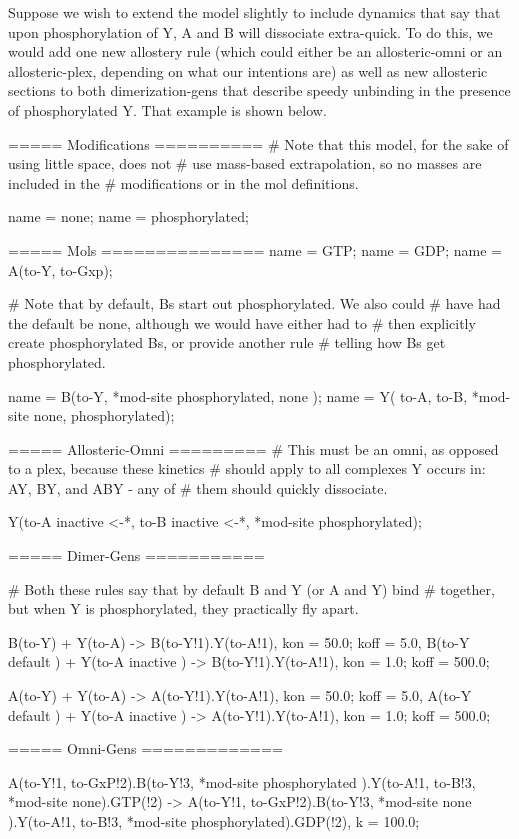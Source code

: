 Suppose we wish to extend the model slightly to include dynamics that
say that upon phosphorylation of Y, A and B will dissociate
extra-quick.  To do this, we would add one new allostery rule (which
could either be an allosteric-omni or an allosteric-plex, depending on
what our intentions are) as well as new allosteric sections to both
dimerization-gens that describe speedy unbinding in the presence of
phosphorylated Y.  That example is shown below.  



\begin{ExampleMZR}
===== Modifications ==========
# Note that this model, for the sake of using little space, does not
# use mass-based extrapolation, so no masses are included in the
# modifications or in the mol definitions.

name = none;
name = phosphorylated;


===== Mols ===============
name = GTP;
name = GDP;
name = A(to-Y, to-Gxp);

# Note that by default, Bs start out phosphorylated.  We also could
# have had the default be none, although we would have either had to
# then explicitly create phosphorylated Bs, or provide another rule
# telling how Bs get phosphorylated.

name = B(to-Y, *mod-site {phosphorylated, none} );
name = Y( to-A, to-B, *mod-site {none, phosphorylated});

===== Allosteric-Omni =========
# This must be an omni, as opposed to a plex, because these kinetics
# should apply to all complexes Y occurs in: AY, BY, and ABY - any of
# them should quickly dissociate.

Y(to-A {inactive <-*}, to-B {inactive <-*}, *mod-site {phosphorylated});


===== Dimer-Gens ===========

# Both these rules say that by default B and Y (or A and Y) bind
# together, but when Y is phosphorylated, they practically fly apart. 

B(to-Y) + Y(to-A) -> B(to-Y!1).Y(to-A!1),
   kon = 50.0;
   koff = 5.0,
  B(to-Y {default} ) + Y(to-A {inactive} ) -> B(to-Y!1).Y(to-A!1),
     kon = 1.0;
     koff = 500.0;

A(to-Y) + Y(to-A) -> A(to-Y!1).Y(to-A!1),
   kon = 50.0;
   koff = 5.0,
  A(to-Y {default} ) + Y(to-A {inactive} ) -> A(to-Y!1).Y(to-A!1),
     kon = 1.0;
     koff = 500.0;

===== Omni-Gens =============

A(to-Y!1, to-GxP!2).B(to-Y!3, *mod-site {phosphorylated} ).Y(to-A!1, to-B!3, *mod-site {none}).GTP(!2) 
 ->
  A(to-Y!1, to-GxP!2).B(to-Y!3, *mod-site {none} ).Y(to-A!1, to-B!3, *mod-site {phosphorylated}).GDP(!2),
  k = 100.0; 

\end{ExampleMZR}



